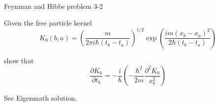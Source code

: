 \documentclass[12pt]{article}
\begin{document}
Feynman and Hibbs problem 3-2

\bigskip
Given the free particle kernel
\begin{equation*}
K_0(b,a)=\left(\frac{m}{2\pi i\hbar(t_b-t_a)}\right)^{1/2}
\exp\left(\frac{im(x_b-x_a)^2}{2\hbar(t_b-t_a)}\right)
\end{equation*}

show that
\begin{equation*}
\frac{\partial K_0}{\partial t_b}
=-\frac{i}{\hbar}
\left(
-\frac{\hbar^2}{2m}
\frac{\partial^2 K_0}{x_b^2}
\right)
\end{equation*}

See Eigenmath solution.
\end{document}
